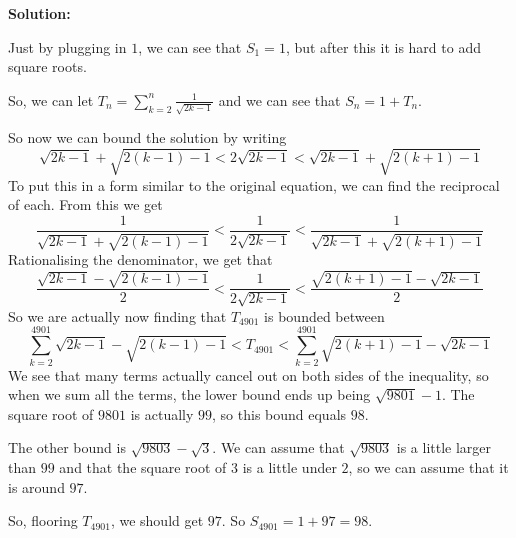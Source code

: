 \documentclass[../mathproblems.tex]{subfiles}
\begin{document}
\textbf{Solution:}

Just by plugging in $1$, we can see that $S_1 = 1$, but after this it is hard to add square roots.

So, we can let $T_n = \sum_{k=2}^n \frac{1}{\sqrt{2k-1}}$ and we can see that $S_n = 1+T_n$.

So now we can bound the solution by writing
\[ \sqrt{2k-1} + \sqrt{2(k-1)-1} < 2\sqrt{2k-1} < \sqrt{2k-1}+\sqrt{2(k+1)-1} \]
To put this in a form similar to the original equation, we can find the reciprocal of each. From this we get
\[ \frac{1}{\sqrt{2k-1}+\sqrt{2(k-1)-1}} < \frac{1}{2\sqrt{2k-1}} < \frac{1}{\sqrt{2k-1}+\sqrt{2(k+1)-1}} \]
Rationalising the denominator, we get that
\[ \frac{\sqrt{2k-1}-\sqrt{2(k-1)-1}}{2} < \frac{1}{2\sqrt{2k-1}} < \frac{\sqrt{2(k+1)-1}-\sqrt{2k-1}}{2} \]
So we are actually now finding that $T_{4901}$ is bounded between
\[ \sum_{k=2}^{4901} \sqrt{2k-1}-\sqrt{2(k-1)-1} < T_{4901} < \sum_{k=2}^{4901} \sqrt{2(k+1)-1}-\sqrt{2k-1} \]
We see that many terms actually cancel out on both sides of the inequality, so when we sum all the terms, the lower bound ends up being $\sqrt{9801}-1$. The square root of $9801$ is actually $99$, so this bound equals $98$.

The other bound is $\sqrt{9803}-\sqrt{3}$. We can assume that $\sqrt{9803}$ is a little larger than $99$ and that the square root of $3$ is a little under $2$, so we can assume that it is around $97$.

So, flooring $T_{4901}$, we should get $97$. So $S_{4901} = 1 + 97 = \boxed{98}$.

\noindent\hrulefill
\end{document}
